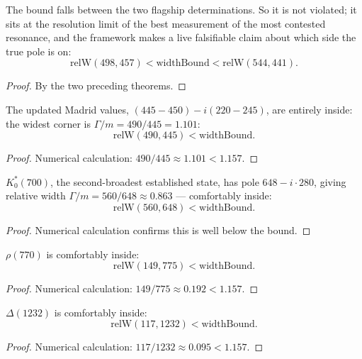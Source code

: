 \begin{theorem}
The bound falls between the two flagship determinations.  So it is not violated; it sits at the resolution limit of the best measurement of the most contested resonance, and the framework makes a live falsifiable claim about which side the true pole is on:
\begin{equation}
\text{relW}(498, 457) < \text{widthBound} < \text{relW}(544, 441).
\end{equation}
\begin{proof}
By the two preceding theorems.
\end{proof}
\end{theorem}

\begin{theorem}
The updated Madrid values, $(445-450) - i(220-245)$, are entirely inside: the widest corner is $\Gamma/m = 490/445 = 1.101$:
\begin{equation}
\text{relW}(490, 445) < \text{widthBound}.
\end{equation}
\begin{proof}
Numerical calculation: $490/445 \approx 1.101 < 1.157$.
\end{proof}
\end{theorem}

\begin{theorem}
$K_0^*(700)$, the second-broadest established state, has pole $648 - i \cdot 280$, giving relative width $\Gamma/m = 560/648 \approx 0.863$ — comfortably inside:
\begin{equation}
\text{relW}(560, 648) < \text{widthBound}.
\end{equation}
\begin{proof}
Numerical calculation confirms this is well below the bound.
\end{proof}
\end{theorem}

\begin{theorem}
$\rho(770)$ is comfortably inside:
\begin{equation}
\text{relW}(149, 775) < \text{widthBound}.
\end{equation}
\begin{proof}
Numerical calculation: $149/775 \approx 0.192 < 1.157$.
\end{proof}
\end{theorem}

\begin{theorem}
$\Delta(1232)$ is comfortably inside:
\begin{equation}
\text{relW}(117, 1232) < \text{widthBound}.
\end{equation}
\begin{proof}
Numerical calculation: $117/1232 \approx 0.095 < 1.157$.
\end{proof}
\end{theorem}

